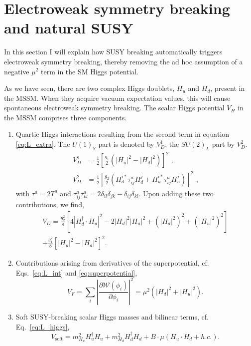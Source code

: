 \section{Electroweak symmetry breaking and natural SUSY  \label{sec:susy_EWbreaking}}

In this section I will explain how SUSY breaking automatically triggers electroweak symmetry
breaking, thereby removing the ad hoc assumption of a negative $\mu^2$ term in the SM Higgs
potential. 

As we have seen, there are two complex Higgs doublets, $H_u$ and $H_d$, present in the MSSM. 
When they acquire vacuum expectation values, this will cause spontaneous electroweak symmetry
breaking. The scalar Higgs potential $V_H$ in the MSSM comprises three components.  

\begin{enumerate}
  \item Quartic Higgs interactions resulting from the second term in equation \ref{eq:L_extra}. The
$U(1)_Y$ part is denoted by $V_D^1$, the $SU(2)_L$ part by $V_D^2$. 
  \begin{align}
  V_D^1 &= \frac{1}{2} \left[ \frac{g_1}{2} \left( |H_u|^2 - |H_d|^2 \right) \right]^2 \textrm{ ,}\\
  V_D^2 &= \frac{1}{2} \left[ \frac{g_2}{2} \left( H_d^{i*}\tau_{ij}^aH_d^j +
H_u^{i*}\tau_{ij}^aH_u^j \right) \right]^2 \textrm{ ,}
\end{align}
with $\tau^a = 2 T^a$ and $\tau_{ij}^a \tau_{kl}^a = 2\delta_{il}\delta_{jk} -
\delta_{ij}\delta_{kl}$. 
Upon adding these two contributions, we find,
\begin{multline}
  V_D = \frac{g^2_2}{8} \left[ 4|H_d^\dagger \cdot H_u|^2 - 2|H_d|^2|H_u|^2 + (|H_d|^2)^2 +
(|H_u|^2)^2 \right] \\ + \frac{g^2_1}{8} \left[ |H_u|^2 - |H_d|^2 \right]^2 .
\end{multline}

\item Contributions arising from derivatives of the superpotential, cf. Eqs.~\ref{eq:L_int} and
\ref{eq:superpotential},
\begin{equation}
  V_F = \sum_i \left| \frac{\partial \mathcal{W}(\phi_i)}{\partial \phi_i} \right|^2 = \mu^2
\left(|H_d|^2 + |H_u|^2\right).
\end{equation}

\item Soft SUSY-breaking scalar Higgs masses and bilinear terms, cf. Eq.~\ref{eq:L_higgs}, 
\begin{equation}
  V_\textrm{soft} = m^2_{H_u} H_u^\dagger H_u + m^2_{H_d} H_d^\dagger H_d + B \cdot \mu (H_u \cdot
H_d + h.c.) .
\end{equation}

\end{enumerate}
